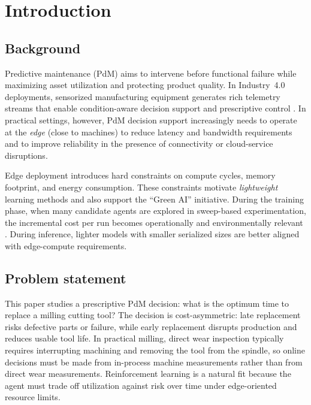 \documentclass[sn-basic]{sn-jnl} %
\begin{document}

\maketitle

\section{Introduction}
\subsection{Background}
Predictive maintenance (PdM) aims to intervene before functional failure while maximizing asset utilization and protecting product quality. In Industry~4.0 deployments, sensorized manufacturing equipment generates rich telemetry streams that enable condition-aware decision support and prescriptive control \cite{Zonta2020, Compare2020}. In practical settings, however, PdM decision support increasingly needs to operate at the \emph{edge} (close to machines) to reduce latency and bandwidth requirements and to improve reliability in the presence of connectivity or cloud-service disruptions.

Edge deployment introduces hard constraints on compute cycles, memory footprint, and energy consumption. These constraints motivate \emph{lightweight} learning methods and also support the ``Green AI'' initiative. During the training phase, when many candidate agents are explored in sweep-based experimentation, the incremental cost per run becomes operationally and environmentally relevant \cite{Schwartz2020, Strubell2019}. During inference, lighter models with smaller serialized sizes are better aligned with edge-compute requirements.

\subsection{Problem statement}
This paper studies a prescriptive PdM decision: what is the optimum time to replace a milling cutting tool? The decision is cost-asymmetric: late replacement risks defective parts or failure, while early replacement disrupts production and reduces usable tool life. In practical milling, direct wear inspection typically requires interrupting machining and removing the tool from the spindle, so online decisions must be made from in-process machine measurements rather than from direct wear measurements. Reinforcement learning is a natural fit because the agent must trade off utilization against risk over time under edge-oriented resource limits.
\end{document}
